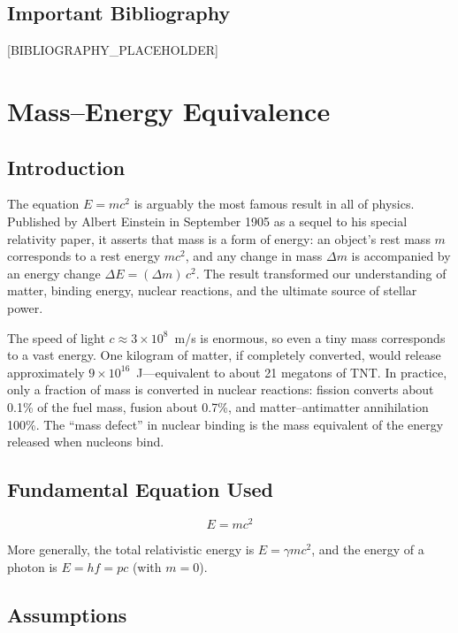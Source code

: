 \documentclass[11pt,openright]{book}
\begin{document}
\section*{Important Bibliography}

[BIBLIOGRAPHY_PLACEHOLDER]


\chapter{Mass--Energy Equivalence}

\section*{Introduction}

The equation $E = mc^{2}$ is arguably the most famous result in all of physics. Published by Albert Einstein in September 1905 as a sequel to his special relativity paper, it asserts that mass is a form of energy: an object's rest mass $m$ corresponds to a rest energy $mc^{2}$, and any change in mass $\Delta m$ is accompanied by an energy change $\Delta E = (\Delta m)\,c^{2}$. The result transformed our understanding of matter, binding energy, nuclear reactions, and the ultimate source of stellar power.

The speed of light $c \approx 3 \times 10^{8}$~m/s is enormous, so even a tiny mass corresponds to a vast energy. One kilogram of matter, if completely converted, would release approximately $9 \times 10^{16}$~J---equivalent to about 21 megatons of TNT. In practice, only a fraction of mass is converted in nuclear reactions: fission converts about 0.1\% of the fuel mass, fusion about 0.7\%, and matter--antimatter annihilation 100\%. The ``mass defect'' in nuclear binding is the mass equivalent of the energy released when nucleons bind.
\section*{Fundamental Equation Used}

\begin{equation}
\boxed{\; E = mc^{2}\;}
\label{eq:mass-energy-einstein}
\end{equation}

More generally, the total relativistic energy is $E = \gamma mc^{2}$, and the energy of a photon is $E = hf = pc$ (with $m = 0$).
\section*{Assumptions}
\end{document}
